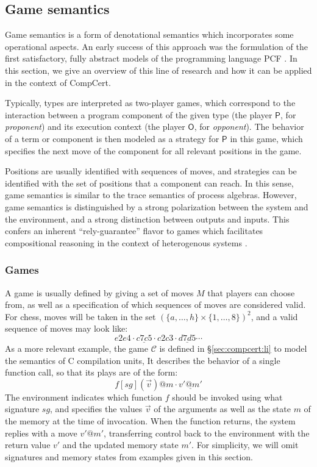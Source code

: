 \documentclass[sigplan,10pt,review,anonymous]{acmart}
\newcommand{\kw}[1]{\ensuremath{ \mathsf{#1} }}
\begin{document}


\subsection{Game semantics} %


Game semantics is a form of denotational semantics which
incorporates some operational aspects.
An early success of this approach was
the formulation of the first satisfactory, fully abstract models
of the programming language PCF \cite{pcfajm,pcfho}.
In this section,
we give an overview of this line of research
and how it can be applied in the context of CompCert.

Typically,
types are interpreted as two-player games,
which correspond to the interaction
between a program component of the given type
(the player \kw{P}, for \emph{proponent})
and its execution context
(the player \kw{O}, for \emph{opponent}).
The behavior of a term or component
is then modeled as a strategy for \kw{P} in this game,
which specifies the next move of the component
for all relevant positions in the game.

Positions are usually identified with sequences of moves,
and strategies can be identified with the set of positions
that a component can reach.
In this sense,
game semantics is similar to
the trace semantics of process algebras.
However, game semantics is distinguished
by a strong polarization between
the system and the environment,
and a strong distinction between outputs and inputs.
This confers an inherent ``rely-guarantee'' flavor
to games which facilitates compositional reasoning
in the context of heterogenous systems \cite{cspgs}.


\subsubsection{Games} \label{sec:mainideas:gs:games} %

A game is usually defined by giving a set of moves $M$
that players can choose from,
as well as a specification of which
sequences of moves are considered valid.
For chess,
moves will be taken in the set $(\{a, \ldots, h\} \times \{1, \ldots, 8\})^2$,
and a valid sequence of moves may look like:
\[ e2e4 \cdot \underline{c7c5} \cdot c2c3 \cdot \underline{d7d5} \cdots \]
As a more relevant example,
the game $\mathcal{C}$ is defined in \S\ref{sec:compcert:li}
to model the semantics of C compilation units,
It describes the behavior of a single function call,
so that its plays are of the form:
\[ f[sg](\vec{v})@m \cdot \underline{v'@m'} \]
The environment indicates
which function $f$ should be invoked
using what signature $sg$,
and specifies the values $\vec{v}$ of the arguments
as well as the state $m$ of the memory
at the time of invocation.
When the function returns,
the system replies with a move $v'@m'$,
transferring control back to the environment
with the return value $v'$
and the updated memory state $m'$.
For simplicity,
we will omit signatures and memory states
from examples given in this section.
\end{document}
